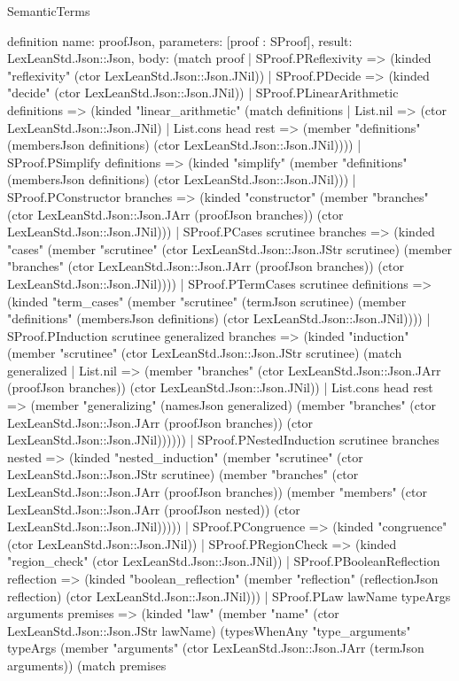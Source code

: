 \begin{lexlean}{SemanticTerms}
\begin{semanticmodule}
definition{
  name: proofJson,
  parameters: [proof : SProof],
  result: LexLeanStd.Json::Json,
  body: (match proof
    | SProof.PReflexivity => (kinded "reflexivity" (ctor LexLeanStd.Json::Json.JNil))
    | SProof.PDecide => (kinded "decide" (ctor LexLeanStd.Json::Json.JNil))
    | SProof.PLinearArithmetic definitions => (kinded "linear_arithmetic" (match definitions
      | List.nil => (ctor LexLeanStd.Json::Json.JNil)
      | List.cons head rest => (member "definitions" (membersJson definitions) (ctor LexLeanStd.Json::Json.JNil))))
    | SProof.PSimplify definitions => (kinded "simplify" (member "definitions" (membersJson definitions) (ctor LexLeanStd.Json::Json.JNil)))
    | SProof.PConstructor branches => (kinded "constructor" (member "branches" (ctor LexLeanStd.Json::Json.JArr (proofJson branches)) (ctor LexLeanStd.Json::Json.JNil)))
    | SProof.PCases scrutinee branches => (kinded "cases" (member "scrutinee" (ctor LexLeanStd.Json::Json.JStr scrutinee) (member "branches" (ctor LexLeanStd.Json::Json.JArr (proofJson branches)) (ctor LexLeanStd.Json::Json.JNil))))
    | SProof.PTermCases scrutinee definitions => (kinded "term_cases" (member "scrutinee" (termJson scrutinee) (member "definitions" (membersJson definitions) (ctor LexLeanStd.Json::Json.JNil))))
    | SProof.PInduction scrutinee generalized branches => (kinded "induction" (member "scrutinee" (ctor LexLeanStd.Json::Json.JStr scrutinee) (match generalized
      | List.nil => (member "branches" (ctor LexLeanStd.Json::Json.JArr (proofJson branches)) (ctor LexLeanStd.Json::Json.JNil))
      | List.cons head rest => (member "generalizing" (namesJson generalized) (member "branches" (ctor LexLeanStd.Json::Json.JArr (proofJson branches)) (ctor LexLeanStd.Json::Json.JNil))))))
    | SProof.PNestedInduction scrutinee branches nested => (kinded "nested_induction" (member "scrutinee" (ctor LexLeanStd.Json::Json.JStr scrutinee) (member "branches" (ctor LexLeanStd.Json::Json.JArr (proofJson branches)) (member "members" (ctor LexLeanStd.Json::Json.JArr (proofJson nested)) (ctor LexLeanStd.Json::Json.JNil)))))
    | SProof.PCongruence => (kinded "congruence" (ctor LexLeanStd.Json::Json.JNil))
    | SProof.PRegionCheck => (kinded "region_check" (ctor LexLeanStd.Json::Json.JNil))
    | SProof.PBooleanReflection reflection => (kinded "boolean_reflection" (member "reflection" (reflectionJson reflection) (ctor LexLeanStd.Json::Json.JNil)))
    | SProof.PLaw lawName typeArgs arguments premises => (kinded "law" (member "name" (ctor LexLeanStd.Json::Json.JStr lawName) (typesWhenAny "type_arguments" typeArgs (member "arguments" (ctor LexLeanStd.Json::Json.JArr (termJson arguments)) (match premises
}
\end{semanticmodule}
\end{lexlean}
